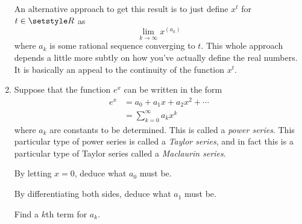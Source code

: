 \begin{enumerate}
  An alternative approach to get this result is to just define
  \(x^t\) for \(t \in \Reals\) as
  \begin{equation*}
   \lim_{k \to \infty} x^{(a_k)}
  \end{equation*}
  where \(a_k\) is some rational sequence converging to \(t\). This whole
  approach depends a little more subtly on how you've actually define the real
  numbers. It is basically an appeal to the continuity of the function
  \(x^t\).
 \item
  Suppose that the function \(e^x\) can be written in the form
  \begin{align*}
   e^x
    &= a_0 + a_1 x + a_2 x^2 + \dotsb \\
    &= \sum_{k = 0}^\infty a_k x^k
  \end{align*}
  where \(a_k\) are constants to be determined. This is called a
  \emph{power series}. This particular type of power series is called a
  \emph{Taylor series}, and in fact this is a particular type of Taylor series
  called a \emph{Maclaurin series}.

  By letting \(x = 0\), deduce what \(a_0\) must be.

  By differentiating both sides, deduce what \(a_1\) must be.

  Find a \(k\)th term for \(a_k\).


\end{enumerate}
